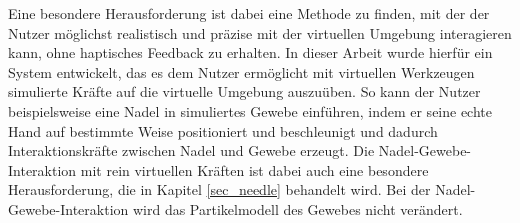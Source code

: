 Eine besondere Herausforderung ist dabei eine Methode zu finden, mit der der Nutzer möglichst realistisch und präzise mit der virtuellen Umgebung interagieren kann, ohne haptisches Feedback zu erhalten. In dieser Arbeit wurde hierfür ein System entwickelt, das es dem Nutzer ermöglicht mit virtuellen Werkzeugen simulierte Kräfte auf die virtuelle Umgebung auszuüben. So kann der Nutzer beispielsweise eine Nadel in simuliertes Gewebe einführen, indem er seine echte Hand auf bestimmte Weise positioniert und beschleunigt und dadurch Interaktionskräfte zwischen Nadel und Gewebe erzeugt. 
Die Nadel-Gewebe-Interaktion mit rein virtuellen Kräften ist dabei auch eine besondere Herausforderung, die in Kapitel \ref{sec_needle} behandelt wird. 
Bei der Nadel-Gewebe-Interaktion wird das Partikelmodell des Gewebes nicht verändert. 




